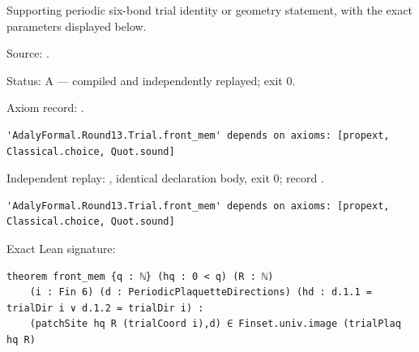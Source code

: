 \begin{theorem}[bp-389]
\label{bp-389}
\leanok
Supporting periodic six-bond trial identity or geometry statement, with the exact parameters displayed below.

\par Source: \texttt{}.
\par Status: A — compiled and independently replayed; exit 0.
\par Axiom record: \texttt{}.
\begin{verbatim}
'AdalyFormal.Round13.Trial.front_mem' depends on axioms: [propext, Classical.choice, Quot.sound]
\end{verbatim}
\par Independent replay: \texttt{}, identical declaration body, exit 0; record \texttt{}.
\begin{verbatim}
'AdalyFormal.Round13.Trial.front_mem' depends on axioms: [propext, Classical.choice, Quot.sound]
\end{verbatim}
\par Exact Lean signature:
\begin{verbatim}
theorem front_mem {q : ℕ} (hq : 0 < q) (R : ℕ)
    (i : Fin 6) (d : PeriodicPlaquetteDirections) (hd : d.1.1 = trialDir i ∨ d.1.2 = trialDir i) :
    (patchSite hq R (trialCoord i),d) ∈ Finset.univ.image (trialPlaq hq R)
\end{verbatim}
\end{theorem}

